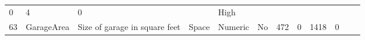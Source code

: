 \documentclass[11pt]{article}
\begin{document}
\begin{longtable}[]{@{}llllllllllll@{}}
\begin{minipage}[t]{0.04\columnwidth}
0\strut
\end{minipage} & \begin{minipage}[t]{0.04\columnwidth}\raggedright\strut
4\strut
\end{minipage} & \begin{minipage}[t]{0.04\columnwidth}\raggedright\strut
0\strut
\end{minipage} & \begin{minipage}[t]{0.04\columnwidth}\raggedright\strut
\strut
\end{minipage} & \begin{minipage}[t]{0.04\columnwidth}\raggedright\strut
High\strut
\end{minipage}\tabularnewline
\begin{minipage}[t]{0.04\columnwidth}\raggedright\strut
63\strut
\end{minipage} & \begin{minipage}[t]{0.04\columnwidth}\raggedright\strut
GarageArea\strut
\end{minipage} & \begin{minipage}[t]{0.04\columnwidth}\raggedright\strut
Size of garage in square feet\strut
\end{minipage} & \begin{minipage}[t]{0.04\columnwidth}\raggedright\strut
Space\strut
\end{minipage} & \begin{minipage}[t]{0.04\columnwidth}\raggedright\strut
Numeric\strut
\end{minipage} & \begin{minipage}[t]{0.04\columnwidth}\raggedright\strut
No\strut
\end{minipage} & \begin{minipage}[t]{0.04\columnwidth}\raggedright\strut
472\strut
\end{minipage} & \begin{minipage}[t]{0.04\columnwidth}\raggedright\strut
0\strut
\end{minipage} & \begin{minipage}[t]{0.04\columnwidth}\raggedright\strut
1418\strut
\end{minipage} & \begin{minipage}[t]{0.04\columnwidth}\raggedright\strut
0\strut
\end{minipage} & \begin{minipage}[t]{0.04\columnwidth}\raggedright\strut
\strut
\end{minipage} & \begin{minipage}[t]{0.04\columnwidth}\raggedright\strut

\end{minipage}
\end{longtable}
\end{document}
